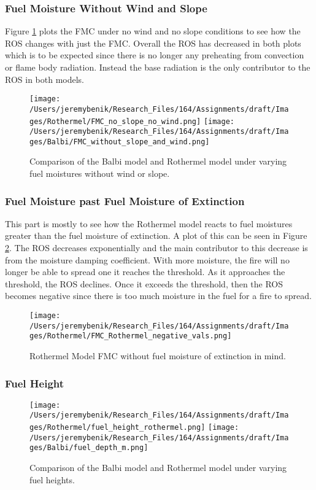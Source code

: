 \documentclass{article}
\begin{document}
\subsubsection*{Fuel Moisture Without Wind and Slope}
\indent Figure \ref{balbi_vs_rother_fmc_no_wind_no_slope} plots the FMC under no wind and no slope conditions to see how the ROS changes with just the FMC. Overall the ROS has decreased in both plots which is to be expected since there is no longer any preheating from convection or flame body radiation. Instead the base radiation is the only contributor to the ROS in both models. 
\begin{figure}[!h]
\centering
  \texttt{[image: /Users/jeremybenik/Research\_Files/164/Assignments/draft/Images/Rothermel/FMC\_no\_slope\_no\_wind.png]}
  \texttt{[image: /Users/jeremybenik/Research\_Files/164/Assignments/draft/Images/Balbi/FMC\_without\_slope\_and\_wind.png]}
  \caption{Comparison of the Balbi model and Rothermel model under varying fuel moistures without wind or slope.}
  \label{balbi_vs_rother_fmc_no_wind_no_slope}
\end{figure}
\subsubsection*{Fuel Moisture past Fuel Moisture of Extinction}
\indent This part is mostly to see how the Rothermel model reacts to fuel moistures greater than the fuel moisture of extinction. A plot of this can be seen in Figure \ref{rothermel_neg}. The ROS decreases exponentially and the main contributor to this decrease is from the moisture damping coefficient. With more moisture, the fire will no longer be able to spread one it reaches the threshold. As it approaches the threshold, the ROS declines. Once it exceeds the threshold, then the ROS becomes negative since there is too much moisture in the fuel for a fire to spread.


\begin{figure}[h]
\centering
  \texttt{[image: /Users/jeremybenik/Research\_Files/164/Assignments/draft/Images/Rothermel/FMC\_Rothermel\_negative\_vals.png]}
  \caption{Rothermel Model FMC without fuel moisture of extinction in mind.}
  \label{rothermel_neg}
\end{figure}



\subsubsection{Fuel Height}
\begin{figure}
\centering
  \texttt{[image: /Users/jeremybenik/Research\_Files/164/Assignments/draft/Images/Rothermel/fuel\_height\_rothermel.png]}
  \texttt{[image: /Users/jeremybenik/Research\_Files/164/Assignments/draft/Images/Balbi/fuel\_depth\_m.png]}
  \caption{Comparison of the Balbi model and Rothermel model under varying fuel heights.}
  \label{fuel height}
\end{figure}
\end{document}
